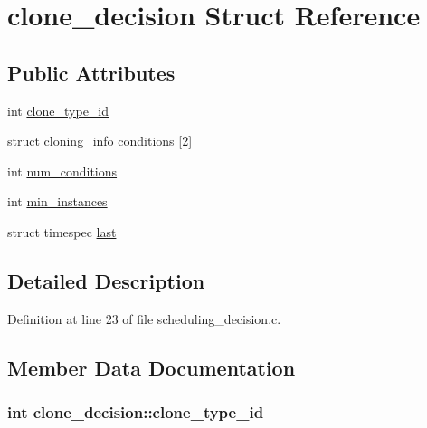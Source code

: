 \hypertarget{structclone__decision}{\section{clone\-\_\-decision Struct Reference}
\label{structclone__decision}
}
\subsection*{Public Attributes}
\begin{DoxyCompactItemize}
\item 
int \hyperlink{structclone__decision_a146faefdfa12d1b225ac34042c14d040}{clone\-\_\-type\-\_\-id}
\item 
struct \hyperlink{structcloning__info}{cloning\-\_\-info} \hyperlink{structclone__decision_ae84268034a0e7757434e248585ab3dbe}{conditions} \mbox{[}2\mbox{]}
\item 
int \hyperlink{structclone__decision_acff7bab31412f4ef8029ab063cc4a72b}{num\-\_\-conditions}
\item 
int \hyperlink{structclone__decision_ad16c65d3fc8367b519b479127b47d281}{min\-\_\-instances}
\item 
struct timespec \hyperlink{structclone__decision_a05c1d1a8a5d670647dfde1e854ffb82b}{last}
\end{DoxyCompactItemize}


\subsection{Detailed Description}


Definition at line 23 of file scheduling\-\_\-decision.\-c.



\subsection{Member Data Documentation}
\hypertarget{structclone__decision_a146faefdfa12d1b225ac34042c14d040}{
\subsubsection[{clone\-\_\-type\-\_\-id}]{\setlength{\rightskip}{0pt plus 5cm}int clone\-\_\-decision\-::clone\-\_\-type\-\_\-id}}\label{structclone__decision_a146faefdfa12d1b225ac34042c14d040}


